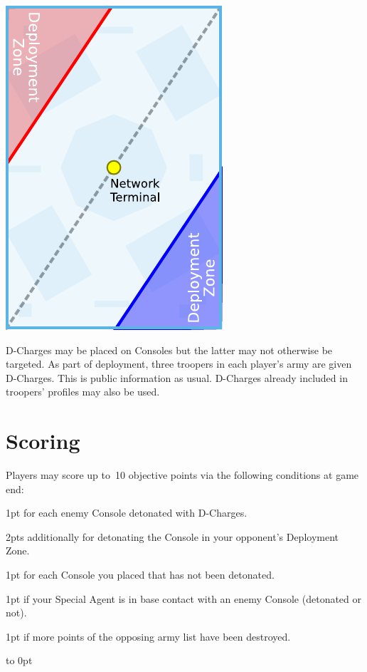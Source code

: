 \begin{minipage}[t]{2in}\centering
\vspace{4pt}   
\includegraphics{maps/map-plant}
\end{minipage}

D-Charges may be placed on Consoles but the latter may not otherwise
be targeted.  As part of deployment, three troopers in each player's
army are given D-Charges.  This is public information as usual.
D-Charges already included in troopers' profiles may also be used.

\section{Scoring}

Players may score up to~10 objective points via the following
conditions at game end:
\begin{squishitemize}
\item 1pt for each enemy Console detonated with D-Charges.
\item 2pts additionally for detonating the Console in your opponent's
  Deployment Zone.
\item 1pt for each Console you placed that has not been detonated.
\item 1pt if your Special Agent is in base contact with an enemy
  Console (detonated or not).
\item 1pt if more points of the opposing army list have been destroyed.
\end{squishitemize}

\vfill
\vbox to 0pt{}